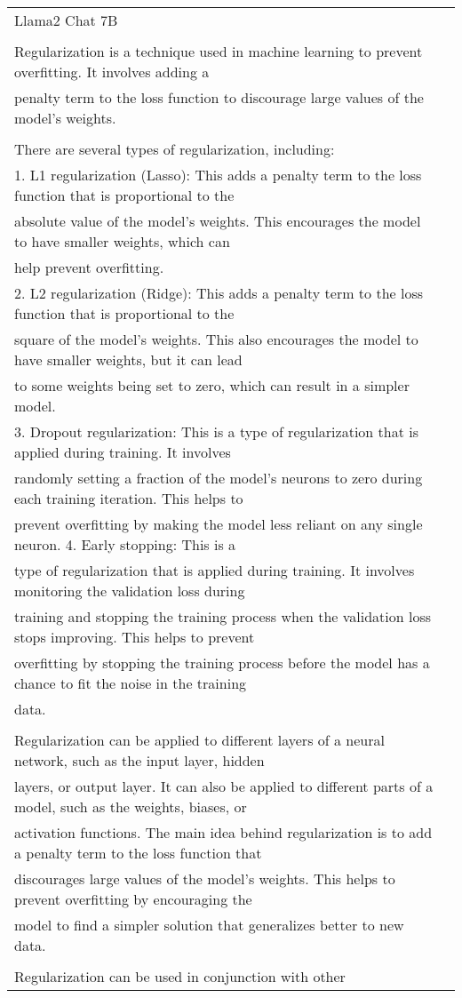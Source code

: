 \begin{center}
\begin{threeparttable}[]
{\begin{tabular}{l|l}
Llama2 Chat 7B & \begin{tabular}[c]{@{}l@{}}Can you explain the concept of regularization in machine learning? \\ \\ Regularization is a technique used in machine learning to prevent overfitting. It involves adding a \\ penalty term to the loss function to discourage large values of the model's weights. \\ \\ There are several types of regularization, including: \\ 1. L1 regularization (Lasso): This adds a penalty term to the loss function that is proportional to the \\ absolute value of the model's weights. This encourages the model to have smaller weights, which can \\ help prevent overfitting. \\ 2. L2 regularization (Ridge): This adds a penalty term to the loss function that is proportional to the \\ square of the model's weights. This also encourages the model to have smaller weights, but it can lead \\ to some weights being set to zero, which can result in a simpler model. \\ 3. Dropout regularization: This is a type of regularization that is applied during training. It involves \\ randomly setting a fraction of the model's neurons to zero during each training iteration. This helps to \\ prevent overfitting by making the model less reliant on any single neuron. 4. Early stopping: This is a \\ type of regularization that is applied during training. It involves monitoring the validation loss during \\ training and stopping the training process when the validation loss stops improving. This helps to prevent \\ overfitting by stopping the training process before the model has a chance to fit the noise in the training \\ data. \\ \\ Regularization can be applied to different layers of a neural network, such as the input layer, hidden \\ layers, or output layer. It can also be applied to different parts of a model, such as the weights, biases, or \\ activation functions. The main idea behind regularization is to add a penalty term to the loss function that \\ discourages large values of the model's weights. This helps to prevent overfitting by encouraging the \\ model to find a simpler solution that generalizes better to new data. \\ \\ Regularization can be used in conjunction with other 
\end{tabular}}
\end{threeparttable}
\end{center}
